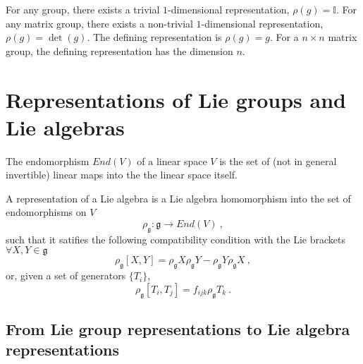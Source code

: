     For any group, there exists a trivial $1$-dimensional representation, $\rho(g) = \mathbb I$. For any matrix group, there exists a non-trivial $1$-dimensional representation, $\rho(g) = \det(g)$. The defining representation is $\rho(g) = g$. For a $n \times n$ matrix group, the defining representation has the dimension $n$.

\section{Representations of Lie groups and Lie algebras}

    \begin{definition}[Endomorphism]
        The endomorphism $End(V)$ of a linear space $V$ is the set of (not in general invertible) linear maps into the the linear space itself.
    \end{definition}

    \begin{definition}
        A representation of a Lie algebra is a Lie algebra homomorphism into the set of endomorphisms on $V$
        \begin{equation*}
            \rho_{\mathfrak g} \colon \mathfrak g \rightarrow End(V) ~,
        \end{equation*}
        such that it satifies the following compatibility condition with the Lie brackets $\forall X, Y \in \mathfrak g$
        \begin{equation}\label{condlie}
            \rho_{\mathfrak g} [X, Y] = \rho_{\mathfrak g} X \rho_{\mathfrak g} Y - \rho_{\mathfrak g} Y \rho_{\mathfrak g} X ~,
        \end{equation}
        or, given a set of generators $\{T_i\}$,
        \begin{equation*}
            \rho_{\mathfrak g} [T_i, T_j] = f_{ijk} \rho_{\mathfrak g} T_k ~.
        \end{equation*}
    \end{definition}

\subsection{From Lie group representations to Lie algebra representations}

